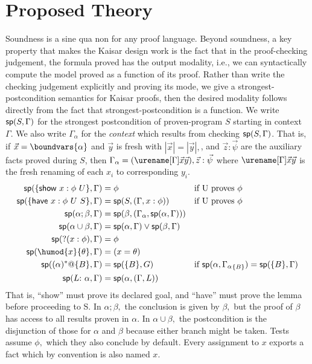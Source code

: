 \documentclass[12pt]{cmuthesis}
\theoremstyle{definition}
\theoremstyle{remark}
\newcommand{\G}{\Gamma}
\begin{document}
\section{Proposed Theory}
Soundness is a sine qua non for any proof language.
Beyond soundness, a key property that makes the Kaisar design work is the fact that in the proof-checking judgement, the formula proved has the output modality, i.e., we can syntactically compute the model proved as a function of its proof.
Rather than write the checking judgement explicitly and proving its mode, we give a strongest-postcondition semantics for Kaisar proofs, then the desired modality follows directly from the fact that strongest-postcondition is a function.
We write $\spost{S}{\G}$ for the strongest postcondition of proven-program $S$ starting in context $\G$.
We also write $\G_\alpha$ for the \emph{context} which results from checking $\spost{S}{\G}$.
That is, if $\vec{x} = \boundvars{\alpha}$ and $\vec{y}$ is fresh with $|\vec{x}| = |\vec{y}|,$, and $\vec{z}:\vec{\psi}$ are the auxiliary facts proved during $S$,
then $\G_\alpha = (\eren{\G}{\vec{x}}{\vec{y}}),\vec{z}:\vec{\psi}$ where $\eren{\G}{\vec{x}}{\vec{y}}$ is the fresh renaming of each $x_i$ to corresponding $y_i$.
\begin{align*}
\spost{\{\sshow{x}{\phi}{U}\}}{\G}             &= \phi                                        &&\text{if U proves }\phi\\
\spost{\{\shave{x}{\phi}{U}{S}\}}{\G}          &= \spost{S}{(\G,x:\phi)}                      &&\text{if U proves }\phi\\
\spost{\alpha;\beta}{\G}                       &= \spost{\beta}{(\G_\alpha,\spost{\alpha}{\G})} &&\\
\spost{\alpha\cup\beta}{\G}                    &= \spost{\alpha}{\G} \vee \spost{\beta}{\G}   &&\\
\spost{?(x:\phi)}{\G} &= \phi &&\\
\spost{\humod{x}{\theta}}{\G} &=(x=\theta) &&\\
  \spost{(\alpha)^*@\{B\}}{\G} &= \spost{\{B\}}{G} &&\text{if }\spost{\alpha}{{\G_\alpha}_{\{B\}}}=\spost{\{B\}}{\G}\\
\spost{L{:}\ \alpha}{\G} &= \spost{\alpha}{(\G,L)} 
\end{align*}
That is, ``show'' must prove its declared goal, and ``have'' must prove the lemma before proceeding to S.
In $\alpha;\beta,$ the conclusion is given by $\beta,$ but the proof of $\beta$ has access to all results proven in $\alpha$.
In $\alpha\cup\beta,$ the postcondition is the disjunction of those for $\alpha$ and $\beta$ because either branch might be taken.
Tests assume $\phi,$ which they also conclude by default.
Every assignment to $x$ exports a fact which by convention is also named $x$.
\end{document}
